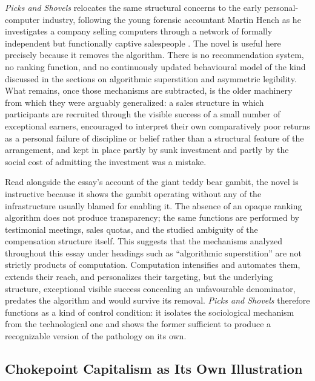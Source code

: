 \documentclass[11pt]{article}
\begin{document}
\emph{Picks and Shovels} relocates the same structural concerns to the early personal-computer industry, following the young forensic accountant Martin Hench as he investigates a company selling computers through a network of formally independent but functionally captive salespeople \parencite{doctorow2025picksandshovels}. The novel is useful here precisely because it removes the algorithm. There is no recommendation system, no ranking function, and no continuously updated behavioural model of the kind discussed in the sections on algorithmic superstition and asymmetric legibility. What remains, once those mechanisms are subtracted, is the older machinery from which they were arguably generalized: a sales structure in which participants are recruited through the visible success of a small number of exceptional earners, encouraged to interpret their own comparatively poor returns as a personal failure of discipline or belief rather than a structural feature of the arrangement, and kept in place partly by sunk investment and partly by the social cost of admitting the investment was a mistake.

Read alongside the essay's account of the giant teddy bear gambit, the novel is instructive because it shows the gambit operating without any of the infrastructure usually blamed for enabling it. The absence of an opaque ranking algorithm does not produce transparency; the same functions are performed by testimonial meetings, sales quotas, and the studied ambiguity of the compensation structure itself. This suggests that the mechanisms analyzed throughout this essay under headings such as ``algorithmic superstition'' are not strictly products of computation. Computation intensifies and automates them, extends their reach, and personalizes their targeting, but the underlying structure, exceptional visible success concealing an unfavourable denominator, predates the algorithm and would survive its removal. \emph{Picks and Shovels} therefore functions as a kind of control condition: it isolates the sociological mechanism from the technological one and shows the former sufficient to produce a recognizable version of the pathology on its own.

\subsection{Chokepoint Capitalism as Its Own Illustration}
\end{document}
